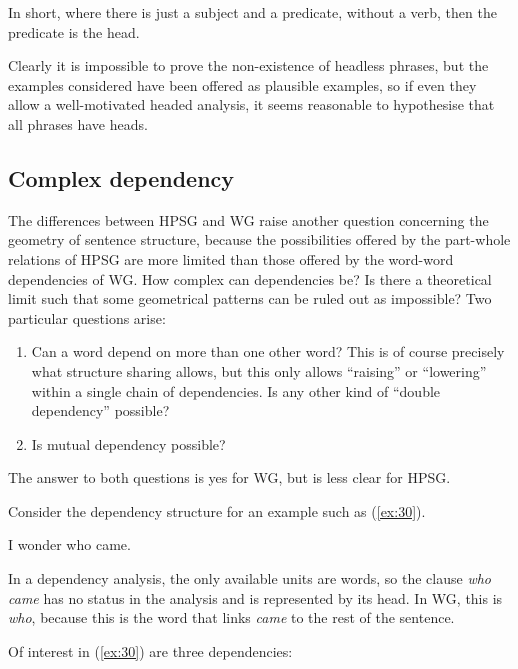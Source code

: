 \documentclass[output=paper
 	        ,biblatex
                ,babelshorthands
                ,newtxmath
                ,draftmode
                ,colorlinks, citecolor=brown
]{langscibook}
\begin{document}
\noindent
In short, where there is just a subject and a predicate, without a verb, then the predicate is the
head.

Clearly it is impossible to prove the non-existence of headless phrases, but the examples considered
have been offered as plausible examples, so if even they allow a well-motivated headed analysis, it
seems reasonable to hypothesise that all phrases have heads.


\subsection{Complex dependency}
\label{sec:5.2}\label{dg-sec-complex-dependency}

The differences between HPSG and WG raise another question concerning the geometry of sentence structure, because the possibilities offered by the part-whole relations of HPSG are more limited than those offered by the word-word dependencies of WG. How complex can dependencies be? Is there a theoretical limit such that some geometrical patterns can be ruled out as impossible? Two particular questions arise:

\begin{enumerate}
	\item \label{it:4} Can a word depend on more than one other word? This is of course precisely what structure sharing allows, but this only allows ``raising'' or ``lowering'' within a single chain of dependencies. Is any other kind of ``double dependency'' possible?
	
	\item \label{it:5} Is mutual dependency possible?
\end{enumerate}

\noindent
The answer to both questions is yes for WG, but is less clear for HPSG.

Consider the dependency structure for an example such as (\ref{ex:30}).

\begin{exe}
	\ex \label{ex:30} I wonder who came.
\end{exe}
	
\noindent
In a dependency analysis, the only available units are words, so the clause \emph{who came} has no status in the analysis and is represented by its head. In WG, this is \emph{who}, because this is the word that links \emph{came} to the rest of the sentence.

Of interest in (\ref{ex:30}) are three dependencies:
\end{document}
